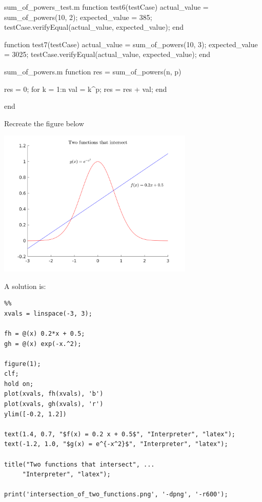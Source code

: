 \begin{ex}
\begin{sol}
\begin{solutionfile}{sum_of_powers_test.m}
function test6(testCase)
    actual_value = sum_of_powers(10, 2);
    expected_value = 385;
    testCase.verifyEqual(actual_value, expected_value);
end

function test7(testCase)
    actual_value = sum_of_powers(10, 3);
    expected_value = 3025;
    testCase.verifyEqual(actual_value, expected_value);
end
\end{solutionfile}
\begin{solutionfile}{sum_of_powers.m}
function res = sum_of_powers(n, p)

res = 0;
for k = 1:n
   val = k^p;
   res = res + val;
end

end
\end{solutionfile}
\end{sol}
\end{ex}





\begin{ex}
Recreate the figure below
\begin{center}
\includegraphics[width=0.7\textwidth]{pic/intersection_of_two_functions.png}
\end{center}
\begin{hint}
\end{hint}
\begin{sol}
A solution is:
\begin{lstlisting}
%%
xvals = linspace(-3, 3);

fh = @(x) 0.2*x + 0.5;
gh = @(x) exp(-x.^2);

figure(1);
clf;
hold on;
plot(xvals, fh(xvals), 'b')
plot(xvals, gh(xvals), 'r')
ylim([-0.2, 1.2])

text(1.4, 0.7, "$f(x) = 0.2 x + 0.5$", "Interpreter", "latex");
text(-1.2, 1.0, "$g(x) = e^{-x^2}$", "Interpreter", "latex");
 
title("Two functions that intersect", ...
     "Interpreter", "latex");
 
print('intersection_of_two_functions.png', '-dpng', '-r600');
\end{lstlisting}
\end{sol}
\end{ex}



